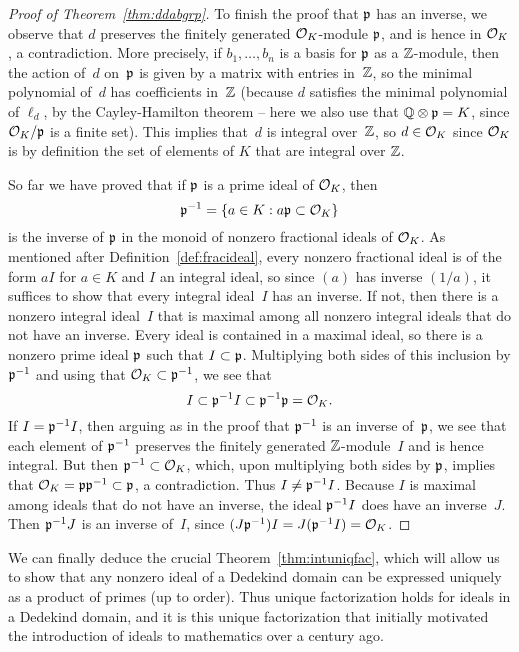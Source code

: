 \begin{proof}[Proof of Theorem~\ref{thm:ddabgrp}]
	To finish the proof that $\mathfrak{p}$ has an inverse, we observe that $d$
	preserves the finitely generated $\mathcal{O}_K$-module $\mathfrak{p}$, and is hence in
	$\mathcal{O}_K$, a contradiction. 
	More precisely, if $b_1,\ldots, b_n$ is a basis for
	$\mathfrak{p}$ as a $\mathbb{Z}$-module, then the action of~$d$ on~$\mathfrak{p}$ is given by a
	matrix with entries in~$\mathbb{Z}$, so the minimal polynomial of~$d$ has
	coefficients in~$\mathbb{Z}$ (because $d$ satisfies the minimal polynomial of
	$\ell_d$, by the Cayley-Hamilton theorem -- here we also use that
	$\mathbb{Q}\otimes\mathfrak{p} = K$, since $\mathcal{O}_K/\mathfrak{p}$ is a finite set).  This implies
	that~$d$ is integral over~$\mathbb{Z}$, so $d\in \mathcal{O}_K$ since $\mathcal{O}_K$ is by
	definition the set of elements of $K$ that are integral over $\mathbb{Z}$.
	
	So far we have proved that if $\mathfrak{p}$ is a prime ideal of $\mathcal{O}_K$, then
	$$
		\mathfrak{p}^{-1} = \{a \in K : a\mathfrak{p} \subset \mathcal{O}_K\}
	$$
	is the inverse of $\mathfrak{p}$ in
	the monoid of nonzero fractional ideals of $\mathcal{O}_K$.  As mentioned after
	Definition~\ref{def:fracideal}, every nonzero fractional
	ideal is of the form $aI$ for $a\in K$ and $I$ an integral ideal, so
	since $(a)$ has inverse $(1/a)$, it suffices to show that every
	integral ideal~$I$ has an inverse.  If not, then there is a nonzero
	integral ideal~$I$ that is maximal among all nonzero integral ideals
	that do not have an inverse.  Every ideal is contained in a maximal
	ideal, so there is a nonzero prime ideal $\mathfrak{p}$ such that $I\subset \mathfrak{p}$.
	Multiplying both sides of this inclusion by $\mathfrak{p}^{-1}$ and using that
	$\mathcal{O}_K\subset \mathfrak{p}^{-1}$, we see that
	$$
		I \subset \mathfrak{p}^{-1} I \subset \mathfrak{p}^{-1}\mathfrak{p} = \mathcal{O}_K.
	$$
	If $I = \mathfrak{p}^{-1} I$, then arguing as in the proof that $\mathfrak{p}^{-1}$ is an
	inverse of~$\mathfrak{p}$, we see that each element of $\mathfrak{p}^{-1}$ preserves the
	finitely generated $\mathbb{Z}$-module~$I$ and is hence integral.  But then
	$\mathfrak{p}^{-1}\subset \mathcal{O}_K$, which, upon multiplying both sides by $\mathfrak{p}$,
	implies that $\mathcal{O}_K = \mathfrak{p} \mathfrak{p}^{-1} \subset \mathfrak{p}$, a contradiction.
	Thus $I \neq \mathfrak{p}^{-1} I$.  Because $I$ is
	maximal among ideals that do not have an inverse, the ideal $\mathfrak{p}^{-1}
	I$ does have an inverse~$J$. Then $\mathfrak{p}^{-1}J$ is an inverse of~$I$,
	since $(J\mathfrak{p}^{-1})I = J(\mathfrak{p}^{-1}I) = \mathcal{O}_K$.
\end{proof}

We can finally deduce the crucial Theorem~\ref{thm:intuniqfac}, which
will allow us to show that any nonzero ideal of a Dedekind domain can
be expressed uniquely as a product of primes (up to order).  Thus
unique factorization holds for ideals in a Dedekind domain, and it is
this unique factorization that initially motivated the introduction of
ideals to mathematics over a century ago.

